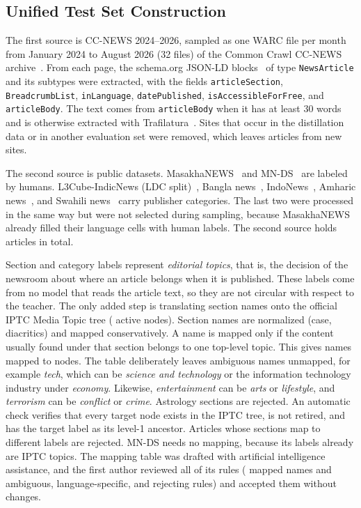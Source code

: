 \subsection{Unified Test Set Construction}
\label{sec:testset}
The first source is CC-NEWS 2024--2026, sampled as one WARC file per month from January 2024 to August 2026 (32 files) of the Common Crawl CC-NEWS archive~\cite{commoncrawl2026ccnews}. From each page, the schema.org JSON-LD blocks~\cite{guha2016schema} of type \texttt{NewsArticle} and its subtypes were extracted, with the fields \texttt{articleSection}, \texttt{BreadcrumbList}, \texttt{inLanguage}, \texttt{datePublished}, \texttt{isAccessibleForFree}, and \texttt{articleBody}. The text comes from \texttt{articleBody} when it has at least 30 words and is otherwise extracted with Trafilatura~\cite{barbaresi2021trafilatura}. Sites that occur in the distillation data or in another evaluation set were removed, which leaves  articles from new sites.

The second source is public datasets. MasakhaNEWS~\cite{adelani2023masakhanews} and MN-DS~\cite{petukhova2023mnds} are labeled by humans. L3Cube-IndicNews (LDC split)~\cite{mirashi2023indicnews}, Bangla news~\cite{hossain2025banglanews}, IndoNews~\cite{indonews2021}, Amharic news~\cite{amharicnews2024}, and Swahili news~\cite{swahilinews2020} carry publisher categories. The last two were processed in the same way but were not selected during sampling, because MasakhaNEWS already filled their language cells with human labels. The second source holds  articles in total.

Section and category labels represent \emph{editorial topics}, that is, the decision of the newsroom about where an article belongs when it is published. These labels come from no model that reads the article text, so they are not circular with respect to the teacher. The only added step is translating section names onto the official IPTC Media Topic tree ( active nodes). Section names are normalized (case, diacritics) and mapped conservatively. A name is mapped only if the content usually found under that section belongs to one top-level topic. This gives  names mapped to  nodes. The table deliberately leaves  ambiguous names unmapped, for example \emph{tech}, which can be \emph{science and technology} or the information technology industry under \emph{economy}. Likewise, \emph{entertainment} can be \emph{arts} or \emph{lifestyle}, and \emph{terrorism} can be \emph{conflict} or \emph{crime}. Astrology sections are rejected. An automatic check verifies that every target node exists in the IPTC tree, is not retired, and has the target label as its level-1 ancestor. Articles whose sections map to different labels are rejected. MN-DS needs no mapping, because its labels already are IPTC topics. The mapping table was drafted with artificial intelligence assistance, and the first author reviewed all of its  rules ( mapped names and  ambiguous, language-specific, and rejecting rules) and accepted them without changes.

